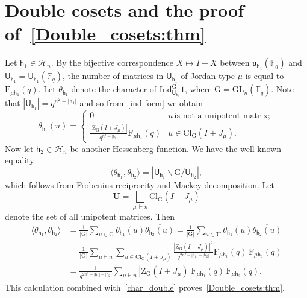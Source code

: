 \documentclass[12pt,a4paper,reqno]{amsart}
\theoremstyle{plain}
\theoremstyle{definition}
\newcommand{\FF}{{\mathbb{F}}}
\newcommand{\1}{\mathds{1}}
\newcommand{\G}{{\mathrm{G}}}
\newcommand{\GL}{\mathrm{GL}}
\newcommand{\F}{\mathrm{F}}
\newcommand{\Ind}{\mathrm{Ind}}
\newcommand{\conj}{\mathrm{Cl}_\G}
\newcommand{\cen}{\mathrm{Z}_\G}
\renewcommand{\u}{\mathfrak{u}}
\newcommand{\U}{\mathsf{U}}
\newcommand{\hes}{\mathsf{h}}
\begin{document}
\section{Double cosets and the proof of~\cref{Double_cosets:thm}}
Let $\hes_1\in\mathcal{H}_n$. By the bijective correspondence $X\mapsto I+X$
between $\u_{\hes_1}(\FF_q)$ and 
$\U_{\hes_1}=\U_{\hes_1}(\FF_q)$,  the number of matrices in $\U_{\hes_1}$ of Jordan type $\mu$ is equal to $\F_{\mu\hes_1}(q)$. Let $\theta_{\hes_1}$ denote the character of $\Ind_{\U_{\hes_1}}^\G 1$, where $\G = \GL_n(\FF_q)$. Note that $|\U_{\hes_1}|=q^{n^2-|\hes_1|}$ and so
from~\cref{ind-form} we obtain
\begin{equation}\label{theta_lmabda:Form}
\theta_{\hes_1}(u)=
\begin{cases}
0 & u\, \text{is not a unipotent matrix};\\
\frac{|\cen(I+J_\mu)|}{q^{n^2-|\hes_1|}}\F_{\mu\hes_1}(q) & u\in\conj(I+J_\mu). 
\end{cases}
\end{equation}
Now let $\hes_2\in\mathcal{H}_n$ be another Hessenberg function. We have the well-known equality
\begin{equation}\label{char_double}
    \langle\theta_{\hes_1},\theta_{\hes_2}\rangle=\left|\U_{\hes_1}\backslash\G/\U_{\hes_2}\right|,
\end{equation}
which follows from Frobenius reciprocity and Mackey decomposition. 
Let \[
\mathbf{U}=\bigsqcup_{\mu\,\vdash n}\conj(I+J_\mu)
\] denote the set of all unipotent matrices. Then 
\begin{equation}
\begin{split}
\langle\theta_{\hes_1},\theta_{\hes_2}\rangle&=\frac{1}{|\G|}\sum_{u\in \G}\theta_{\hes_1}(u)\overline{\theta_{\hes_2}(u)}=\frac{1}{|\G|}\sum_{u\in \mathbf{U}}\theta_{\hes_1}(u)\overline{\theta_{\hes_2}(u)}\\
&=\frac{1}{|\G|}\sum_{\mu\vdash n}\sum_{u\in\conj(I+J_\mu)}\frac{|\cen(I+J_\mu)|^2}{q^{2n^2-|\hes_1|-|\hes_2|}}\F_{\mu\hes_1}(q)\,\F_{\mu\hes_2}(q)\\
&=\frac{1}{q^{2n^2-|\hes_1|-|\hes_2|}}\sum_{\mu\vdash n} |\cen(I+J_\mu)|\F_{\mu\hes_1}(q)\, \F_{\mu\hes_2}(q). 
\end{split}
\end{equation}
This calculation combined with~\cref{char_double} proves~\cref{Double_cosets:thm}.
\end{document}
